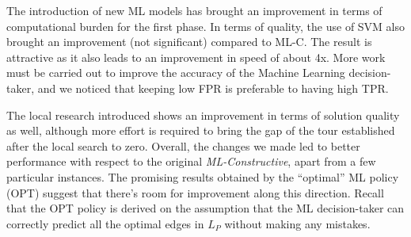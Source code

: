 \documentclass{article}
\begin{document}
The introduction of new ML models has brought an improvement in terms of computational burden for the first phase.
In terms of quality, the use of SVM also brought an improvement (not significant) compared to ML-C.
The result is attractive as it also leads to an improvement in speed of about 4x.
More work must be carried out to improve the accuracy of the Machine Learning decision-taker, and
we noticed that keeping low FPR is preferable to having high TPR.

\vspace{5 pt}

The local research introduced shows an improvement in terms of solution quality as well, although more effort is required to bring the gap of the tour established after the local search to zero.
Overall, the changes we made led to better performance with respect to the original \emph{ML-Constructive}, apart from a few particular instances.
The promising results obtained by the ``optimal'' ML policy (OPT) suggest that there's room for improvement along this direction. 
Recall that the OPT policy is derived on the assumption that the ML decision-taker can correctly predict all the optimal edges in $L_P$ without making any mistakes.
\end{document}
